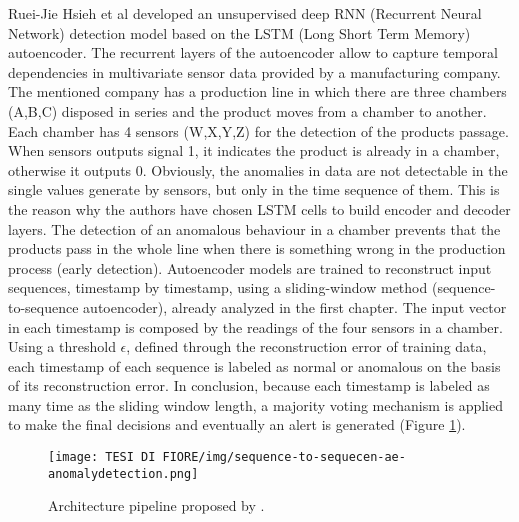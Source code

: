 Ruei-Jie Hsieh et al \cite{9UnsupervisedOnlineAnomalyDetectionMultivariate} developed an unsupervised deep RNN (Recurrent Neural Network) detection model based on the LSTM (Long Short Term Memory) autoencoder. The recurrent layers of the autoencoder allow to capture temporal dependencies in multivariate sensor data provided by a manufacturing company. The mentioned company has a production line in which there are three chambers (A,B,C) disposed in series and the product moves from a chamber to another. Each chamber has 4 sensors (W,X,Y,Z) for the detection of the products passage. When sensors outputs signal 1, it indicates the product is already in a chamber, otherwise it outputs 0. Obviously, the anomalies in data are not detectable in the single values generate by sensors, but only in the time sequence of them. This is the reason why the authors have chosen LSTM cells to build encoder and decoder layers. The detection of an anomalous behaviour in a chamber prevents that the products pass in the whole line when there is something wrong in the production process (early detection). Autoencoder models are trained to reconstruct input sequences, timestamp by timestamp, using a sliding-window method (sequence-to-sequence autoencoder), already analyzed in the first chapter. The input vector in each timestamp is composed by the readings of the four sensors in a chamber. Using a threshold $\epsilon$, defined through the reconstruction error of training data, each timestamp of each sequence is labeled as normal or anomalous on the basis of its reconstruction error. In conclusion, because each timestamp is labeled as many time as the sliding window length, a majority voting mechanism is applied to make the final decisions and eventually an alert is generated (Figure \ref{seq2seq-architecture}).\\
\begin{figure}[ht]
\texttt{[image: TESI DI FIORE/img/sequence-to-sequecen-ae-anomalydetection.png]}
\centering
\caption{Architecture pipeline proposed by \cite{9UnsupervisedOnlineAnomalyDetectionMultivariate}.}
\label{seq2seq-architecture}
\end{figure}\\
